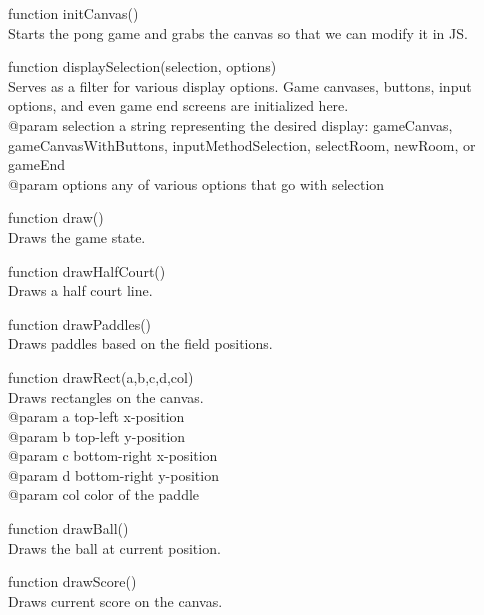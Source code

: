 \documentclass[12pt]{article}
\newenvironment{itemize*}%
  {\begin{itemize}%
  	\setlength{\parsep}{0pt}
    \setlength{\itemsep}{0pt}%
    \setlength{\parskip}{0pt}}%
  {\end{itemize}}
\begin{document}
\begin{itemize*}
\item function initCanvas() \\
Starts the pong game and grabs the canvas so that we can modify it in JS.
\item function displaySelection(selection, options)\\
Serves as a filter for various display options.  Game canvases, buttons, input options, and even game end screens are initialized here.\\
 @param {selection} a string representing the desired display: gameCanvas, gameCanvasWithButtons, inputMethodSelection, selectRoom, newRoom, or gameEnd\\
 @param {options} any of various options that go with {selection}
\item function draw() \\
Draws the game state.
\item function drawHalfCourt()\\ 
Draws a half court line.
\item function drawPaddles()\\
Draws paddles based on the field positions.
\item function drawRect(a,b,c,d,col)\\
Draws rectangles on the canvas.\\
@param a top-left x-position\\
 @param b top-left y-position\\
 @param c bottom-right x-position\\
 @param d bottom-right y-position\\
 @param col color of the paddle
\item function drawBall()\\
Draws the ball at current position.
\item function drawScore()\\
Draws current score on the canvas.
\end{itemize*}
\end{document}

